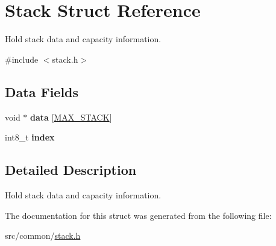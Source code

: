 \hypertarget{struct_stack}{}\section{Stack Struct Reference}
\label{struct_stack}


Hold stack data and capacity information.  




{\ttfamily \#include $<$stack.\+h$>$}

\subsection*{Data Fields}
\begin{DoxyCompactItemize}
\item 
\mbox{\label{struct_stack_a514cceaf30229a178ec3b9680ea54bcb}} 
void $\ast$ {\bfseries data} \mbox{[}\hyperlink{stack_8h_af24298a5ce56647751e432673282c6e2}{M\+A\+X\+\_\+\+S\+T\+A\+CK}\mbox{]}
\item 
\mbox{\label{struct_stack_ac73839a7c6cf3b1544ee9e5ef20c138a}} 
int8\+\_\+t {\bfseries index}
\end{DoxyCompactItemize}


\subsection{Detailed Description}
Hold stack data and capacity information. 

The documentation for this struct was generated from the following file\+:\begin{DoxyCompactItemize}
\item 
src/common/\hyperlink{stack_8h}{stack.\+h}\end{DoxyCompactItemize}
